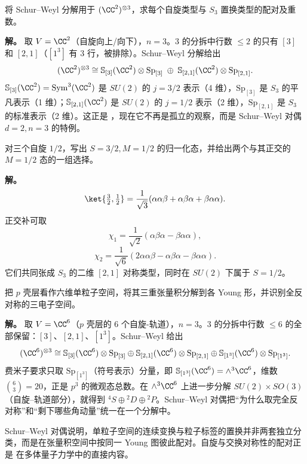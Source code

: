 \begin{example}[{回到三个自旋 $1/2$}]
将 Schur--Weyl 分解用于 $(\CC^2)^{\otimes3}$，求每个自旋类型与 $S_3$ 置换类型的配对及重数。

\textbf{解。} 取 $V=\CC^2$（自旋向上/向下），$n=3$。$3$ 的分拆中行数 $\le2$ 的只有 $[3]$ 和 $[2,1]$（$[1^3]$ 有 3 行，被排除）。Schur--Weyl 分解给出
\[
(\CC^2)^{\otimes3}
\cong\mathbb{S}_{[3]}(\CC^2)\otimes\mathrm{Sp}_{[3]}
\;\oplus\;
\mathbb{S}_{[2,1]}(\CC^2)\otimes\mathrm{Sp}_{[2,1]}.
\]
$\mathbb{S}_{[3]}(\CC^2)=\mathrm{Sym}^3(\CC^2)$ 是 $SU(2)$ 的 $j=3/2$ 表示（4 维），$\mathrm{Sp}_{[3]}$ 是 $S_3$ 的平凡表示（1 维）；$\mathbb{S}_{[2,1]}(\CC^2)$ 是 $SU(2)$ 的 $j=1/2$ 表示（2 维），$\mathrm{Sp}_{[2,1]}$ 是 $S_3$ 的标准表示（2 维）。这正是 ，现在它不再是孤立的观察，而是 Schur--Weyl 对偶 $d=2,n=3$ 的特例。
\end{example}

\begin{workedexample}
对三个自旋 $1/2$，写出 $S=3/2,M=1/2$ 的归一化态，并给出两个与其正交的 $M=1/2$ 态的一组选择。

\textbf{解。}
\[
\ket{\tfrac32,\tfrac12}
=\frac1{\sqrt3}
(\alpha\alpha\beta+\alpha\beta\alpha+\beta\alpha\alpha).
\]
正交补可取
\[
\chi_1=\frac1{\sqrt2}(\alpha\beta\alpha-\beta\alpha\alpha),
\]
\[
\chi_2=\frac1{\sqrt6}(2\alpha\alpha\beta-\alpha\beta\alpha-\beta\alpha\alpha).
\]
它们共同张成 $S_3$ 的二维 $[2,1]$ 对称类型，同时在 $SU(2)$ 下属于 $S=1/2$。
\end{workedexample}


\begin{example}
把 $p$ 壳层看作六维单粒子空间，将其三重张量积分解到各 Young 形，并识别全反对称的三电子空间。

\textbf{解。} 取 $V=\CC^6$（$p$ 壳层的 6 个自旋-轨道），$n=3$。$3$ 的分拆中行数 $\le6$ 的全部保留：$[3]$、$[2,1]$、$[1^3]$。Schur--Weyl 给出
\[
(\CC^6)^{\otimes3}
\cong\mathbb{S}_{[3]}(\CC^6)\otimes\mathrm{Sp}_{[3]}
\oplus\mathbb{S}_{[2,1]}(\CC^6)\otimes\mathrm{Sp}_{[2,1]}
\oplus\mathbb{S}_{[1^3]}(\CC^6)\otimes\mathrm{Sp}_{[1^3]}.
\]
费米子要求只取 $\mathrm{Sp}_{[1^3]}$（符号表示）分量，即 $\mathbb{S}_{[1^3]}(\CC^6)=\wedge^3\CC^6$，维数 $\binom63=20$，正是 $p^3$ 的微观态总数。在 $\wedge^3\CC^6$ 上进一步分解 $SU(2)\times SO(3)$（自旋--轨道部分），就得到 $^4S\oplus{}^2D\oplus{}^2P$。Schur--Weyl 对偶把“为什么取完全反对称”和“剩下哪些角动量”统一在一个分解中。
\end{example}

Schur--Weyl 对偶说明，单粒子空间的连续变换与粒子标签的置换并非两套独立分类，而是在张量积空间中按同一 Young 图彼此配对。自旋与交换对称性的配对正是  在多体量子力学中的直接内容。

